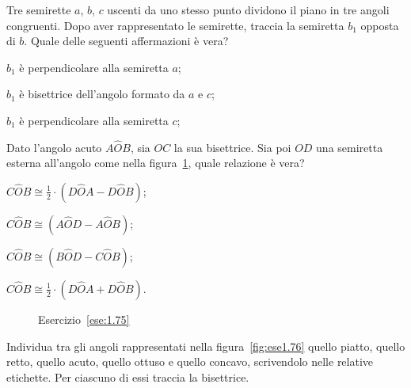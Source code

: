 \begin{esercizio}
\label{ese:1.74}
Tre semirette \(a\), \(b\), \(c\) uscenti da uno stesso punto dividono il 
piano in tre angoli congruenti. Dopo aver rappresentato le semirette, 
traccia la semiretta \(b_1\) opposta di \(b\). Quale delle seguenti 
affermazioni è vera?
\begin{enumeratea}
\item \(b_1\) è perpendicolare alla semiretta \(a\);
\item \(b_1\) è bisettrice dell'angolo formato da \(a\) e \(c\);
\item \(b_1\) è perpendicolare alla semiretta \(c\);
\end{enumeratea}
\end{esercizio}

\begin{esercizio}
\label{ese:1.75}
Dato l'angolo acuto \(A\widehat{O}B\), sia \(OC\) la sua bisettrice. Sia 
poi \(OD\) una semiretta esterna all'angolo come nella 
figura~\ref{fig:ese1.75}, quale relazione è vera?
\begin{multicols}{2}
\begin{enumeratea}
\item \(C\widehat{O}B\cong 
\frac{1}{2}\cdot(D\widehat{O}A-D\widehat{O}B)\);
\item \(C\widehat{O}B\cong (A\widehat{O}D-A\widehat{O}B)\);
\item \(C\widehat{O}B\cong (B\widehat{O}D-C\widehat{O}B)\);
\item \(C\widehat{O}B\cong 
\frac{1}{2}\cdot(D\widehat{O}A+D\widehat{O}B)\).
\end{enumeratea}
\end{multicols}
\end{esercizio}


\begin{inaccessibleblock}
 \begin{figure}[htb]
 \centering
 \caption{Esercizio~\ref{ese:1.75}}\label{fig:ese1.75}
\end{figure}
\end{inaccessibleblock}

\begin{esercizio}
\label{ese:1.76}
Individua tra gli angoli rappresentati nella figura~\ref{fig:ese1.76} 
quello piatto, quello retto, quello acuto, quello ottuso e quello 
concavo, scrivendolo nelle relative etichette. Per ciascuno di essi 
traccia la bisettrice.
\end{esercizio}


